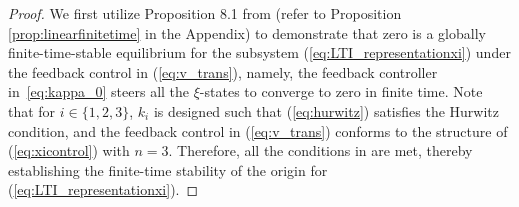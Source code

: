{{\begin{proof}
  We first utilize Proposition 8.1 from \cite{bhat2005geometric} (refer to Proposition \ref{prop:linearfinitetime} in the Appendix) to demonstrate that zero is a globally finite-time-stable equilibrium for the subsystem (\ref{eq:LTI_representationxi}) under the feedback control in (\ref{eq:v_trans}), namely, the feedback controller in~\eqref{eq:kappa_0} steers all the $\xi$-states to converge to zero in finite time. Note that  for $i \in \{1, 2, 3\}$, $k_{i}$ is designed such that (\ref{eq:hurwitz}) satisfies the Hurwitz condition, and the feedback control in (\ref{eq:v_trans}) conforms to the structure of (\ref{eq:xicontrol}) with $n = 3$. Therefore, all the conditions in \cite[Proposition 8.1]{bhat2005geometric} are met, thereby establishing the finite-time stability of the origin for (\ref{eq:LTI_representationxi}).


\end{proof}}}
